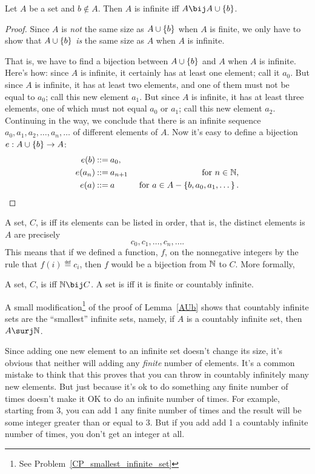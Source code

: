 \begin{lemma}\label{AUb}
  Let $A$ be a set and $b \notin A$.  Then $A$ is infinite iff $A \bij A
  \union \set{b}$.
\end{lemma}
\begin{proof}
  Since $A$ is \emph{not} the same size as $A \cup \left\{b\right\}$ when $A$ is
  finite, we only have to show that $A \cup \left\{b\right\}$ \emph{is} the same
  size as $A$ when $A$ is infinite.

That is, we have to find a bijection between $A \cup \left\{b\right\}$ and $A$
when $A$ is infinite.  Here's how: since $A$ is infinite, it certainly has
at least one element; call it $a_0$.  But since $A$ is infinite, it has at
least two elements, and one of them must not be equal to $a_0$; call this
new element $a_1$.  But since $A$ is infinite, it has at least three
elements, one of which must not equal $a_0$ or $a_1$; call this new
element $a_2$.  Continuing in the way, we conclude that there is an
infinite sequence $a_0,a_1,a_2,\dots,a_n,\dots$ of different elements of
$A$.  Now it's easy to define a bijection $e: A \cup \left\{b\right\} \to A$:
\begin{align*}
e(b) & \mathbin{::=} a_0,\\
e(a_n) & \mathbin{::=} a_{n+1}  &\text{ for } n \in \mathbb{N},\\
e(a) & \mathbin{::=} a & \text{ for } a \in A - \left\{b,a_0,a_1,\dots\right\}.
\end{align*}
\end{proof}

A set, $C$, is  iff its elements can be listed in order,
that is, the distinct elements is $A$ are precisely
\[
c_0, c_1, \dots, c_n, \dots.
\]
This means that if we defined a function, $f$, on the nonnegative integers
by the rule that $f(i) \eqdef c_i$, then $f$ would be a bijection from
$\mathbb{N}$ to $C$.  More formally,

\begin{definition}
  A set, $C$, is  iff $\naturals \bij C$.  A set
  is  iff it is finite or countably infinite.
\end{definition}

A small modification\footnote{See Problem~\ref{CP_smallest_infinite_set}}
of the proof of Lemma~\ref{AUb} shows that countably infinite sets are
the ``smallest'' infinite sets, namely, if $A$ is a countably infinite
set, then $A \surj \naturals$.

Since adding one new element to an infinite set doesn't change its
size, it's obvious that neither will adding any \emph{finite} number
of elements.  It's a common mistake to think that this proves that you
can throw in countably infinitely many new elements.  But just because
it's ok to do something any finite number of times doesn't make it OK
to do an infinite number of times.  For example, starting from 3, you
can add 1 any finite number of times and the result will be some
integer greater than or equal to 3.  But if you add add 1 a countably
infinite number of times, you don't get an integer at all.

